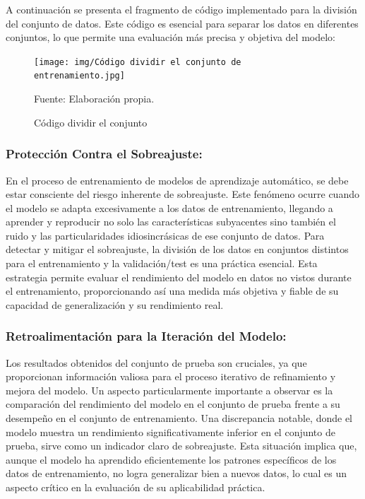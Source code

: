 A continuación se presenta el fragmento de código implementado para la división del conjunto de datos. Este código es esencial para separar los datos en diferentes conjuntos, lo que permite una evaluación más precisa y objetiva del modelo:

\begin{figure}[H]
    \begin{minipage}[t]{0.9\textwidth}
        \caption{Código dividir el conjunto}
        \label{dividir_conjunto}        
    \end{minipage}

    \vspace{10pt}

    \begin{minipage}[b]{1\textwidth}
        \centering
        \texttt{[image: img/Código dividir el conjunto de entrenamiento.jpg]}        
    \end{minipage}

    \begin{minipage}[t]{0.9\textwidth}
        Fuente: Elaboración propia.
    \end{minipage}
\end{figure}

\subsubsection{Protección Contra el Sobreajuste:}
En el proceso de entrenamiento de modelos de aprendizaje automático, se debe estar consciente del riesgo inherente de sobreajuste. Este fenómeno ocurre cuando el modelo se adapta excesivamente a los datos de entrenamiento, llegando a aprender y reproducir no solo las características subyacentes sino también el ruido y las particularidades idiosincrásicas de ese conjunto de datos. Para detectar y mitigar el sobreajuste, la división de los datos en conjuntos distintos para el entrenamiento y la validación/test es una práctica esencial. Esta estrategia permite evaluar el rendimiento del modelo en datos no vistos durante el entrenamiento, proporcionando así una medida más objetiva y fiable de su capacidad de generalización y su rendimiento real.

\subsubsection{Retroalimentación para la Iteración del Modelo:}
Los resultados obtenidos del conjunto de prueba son cruciales, ya que proporcionan información valiosa para el proceso iterativo de refinamiento y mejora del modelo. Un aspecto particularmente importante a observar es la comparación del rendimiento del modelo en el conjunto de prueba frente a su desempeño en el conjunto de entrenamiento. Una discrepancia notable, donde el modelo muestra un rendimiento significativamente inferior en el conjunto de prueba, sirve como un indicador claro de sobreajuste. Esta situación implica que, aunque el modelo ha aprendido eficientemente los patrones específicos de los datos de entrenamiento, no logra generalizar bien a nuevos datos, lo cual es un aspecto crítico en la evaluación de su aplicabilidad práctica.


